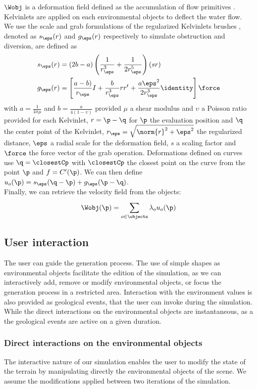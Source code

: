 $\Wobj$ is a deformation field defined as the accumulation of flow primitives \cite{Wejchert1991}. Kelvinlets are applied on each environmental objects to deflect the water flow. We use the scale and grab formulations of the regularized Kelvinlets brushes \cite{DeGoes2017}, denoted as $s_\eps(r)$ and $g_\eps(r)$ respectively to simulate obstruction and diversion, are defined as
\begin{align*}
    s_\eps(r) &= (2b - a) \left (\frac{1}{r_\eps^3} + \frac{1}{2r_\eps^5} \right)(s r) \\
    g_\eps(r) &= \left[ \frac{a - b)}{r_\eps}I + \frac{b}{r_\eps^3} r r^t + 
\frac{a \eps^2}{2 r_\eps^3} \identity \right] \force
\end{align*}
with $a = \frac{1}{4 \pi \mu}$ and $b = \frac{a}{4 (1 - \upsilon)}$ provided $\mu$ a shear modulus and $\upsilon$ a Poisson ratio provided for each Kelvinlet, $r = \p - \q$ for $\p$ the evaluation position and $\q$ the center point of the Kelvinlet, $r_\eps = \sqrt{\norm{r}^2 + \eps^2}$ the regularized distance, $\eps$ a radial scale for the deformation field, $s$ a scaling factor and $\force$ the force vector of the grab operation.
Deformations defined on curves use $\q = \closestCp$ with $\closestCp$ the closest point on the curve from the point $\p$ and $f = C'(\p)$. We can then define $u_o(\p) = s_\eps(\q - \p) + g_\eps(\p - \q)$. \\
Finally, we can retrieve the velocity field from the objects:
\begin{align*}
    \Wobj(\p) = \sum_{o \in \objects}^{}{\lambda_o u_o(\p)}
\end{align*}


\subsection{User interaction}
\label{sec:env-obj_interaction}
The user can guide the generation process. The use of simple shapes as environmental objects facilitate the edition of the simulation, as we can interactively add, remove or modify environmental objects, or focus the generation process in a restricted area. Interaction with the environment values is also provided as geological events, that the user can invoke during the simulation. While the direct interactions on the environmental objects are instantaneous, as a the geological events are active on a given duration.

\subsubsection{Direct interactions on the environmental objects}
\label{sec:env-obj_manual-interaction}
The interactive nature of our simulation enables the user to modify the state of the terrain by manipulating directly the environmental objects of the scene. We assume the modifications applied between two iterations of the simulation.

